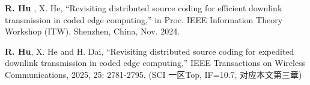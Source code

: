 
\item \textbf{R. Hu} , X. He, “Revisiting distributed source coding for efficient downlink transmission in coded edge computing,” in Proc. IEEE Information Theory Workshop (ITW), Shenzhen, China, Nov. 2024. 
\item \textbf{R. Hu}, X. He and H. Dai, “Revisiting distributed source coding for expedited downlink transmission in coded edge computing,” IEEE Transactions on Wireless Communications, 2025, 25: 2781-2795. (SCI 一区Top, IF=10.7, 对应本文第三章)



